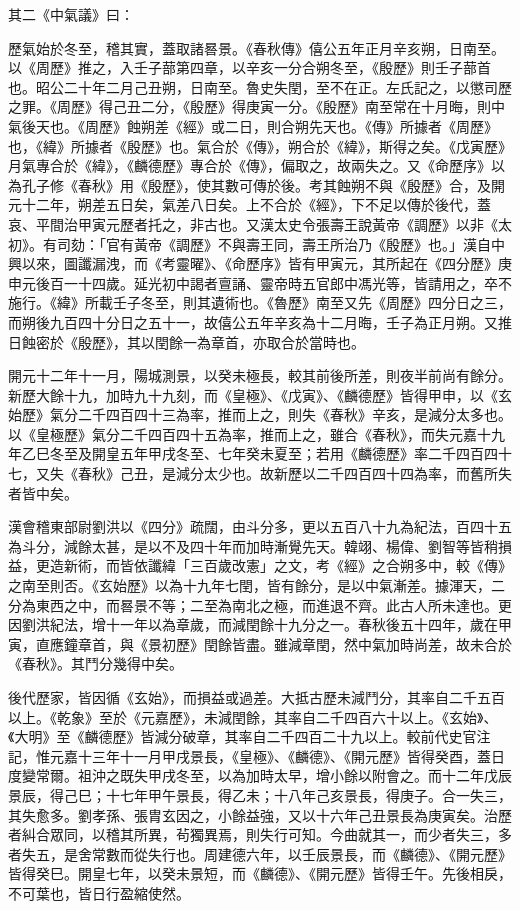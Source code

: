 \begin{pinyinscope}
 其二《中氣議》曰：



 歷氣始於冬至，稽其實，蓋取諸晷景。《春秋傳》僖公五年正月辛亥朔，日南至。以《周歷》推之，入壬子蔀第四章，以辛亥一分合朔冬至，《殷歷》則壬子蔀首也。昭公二十年二月己丑朔，日南至。魯史失閏，至不在正。左氏記之，以懲司歷之罪。《周歷》得己丑二分，《殷歷》得庚寅一分。《殷歷》南至常在十月晦，則中氣後天也。《周歷》蝕朔差《經》或二日，則合朔先天也。《傳》所據者《周歷》也，《緯》所據者《殷歷》也。氣合於《傳》，朔合於《緯》，斯得之矣。《戊寅歷》月氣專合於《緯》，《麟德歷》專合於《傳》，偏取之，故兩失之。又《命歷序》以為孔子修《春秋》用《殷歷》，使其數可傳於後。考其蝕朔不與《殷歷》合，及開元十二年，朔差五日矣，氣差八日矣。上不合於《經》，下不足以傳於後代，蓋哀、平間治甲寅元歷者托之，非古也。又漢太史令張壽王說黃帝《調歷》以非《太初》。有司劾：「官有黃帝《調歷》不與壽王同，壽王所治乃《殷歷》也。」漢自中興以來，圖讖漏洩，而《考靈曜》、《命歷序》皆有甲寅元，其所起在《四分歷》庚申元後百一十四歲。延光初中謁者亶誦、靈帝時五官郎中馮光等，皆請用之，卒不施行。《緯》所載壬子冬至，則其遺術也。《魯歷》南至又先《周歷》四分日之三，而朔後九百四十分日之五十一，故僖公五年辛亥為十二月晦，壬子為正月朔。又推日蝕密於《殷歷》，其以閏餘一為章首，亦取合於當時也。



 開元十二年十一月，陽城測景，以癸未極長，較其前後所差，則夜半前尚有餘分。新歷大餘十九，加時九十九刻，而《皇極》、《戊寅》、《麟德歷》皆得甲申，以《玄始歷》氣分二千四百四十三為率，推而上之，則失《春秋》辛亥，是減分太多也。以《皇極歷》氣分二千四百四十五為率，推而上之，雖合《春秋》，而失元嘉十九年乙巳冬至及開皇五年甲戌冬至、七年癸未夏至；若用《麟德歷》率二千四百四十七，又失《春秋》己丑，是減分太少也。故新歷以二千四百四十四為率，而舊所失者皆中矣。



 漢會稽東部尉劉洪以《四分》疏闊，由斗分多，更以五百八十九為紀法，百四十五為斗分，減餘太甚，是以不及四十年而加時漸覺先天。韓翊、楊偉、劉智等皆稍損益，更造新術，而皆依讖緯「三百歲改憲」之文，考《經》之合朔多中，較《傳》之南至則否。《玄始歷》以為十九年七閏，皆有餘分，是以中氣漸差。據渾天，二分為東西之中，而晷景不等；二至為南北之極，而進退不齊。此古人所未達也。更因劉洪紀法，增十一年以為章歲，而減閏餘十九分之一。春秋後五十四年，歲在甲寅，直應鐘章首，與《景初歷》閏餘皆盡。雖減章閏，然中氣加時尚差，故未合於《春秋》。其鬥分幾得中矣。



 後代歷家，皆因循《玄始》，而損益或過差。大抵古歷未減鬥分，其率自二千五百以上。《乾象》至於《元嘉歷》，未減閏餘，其率自二千四百六十以上。《玄始》、《大明》至《麟德歷》皆減分破章，其率自二千四百二十九以上。較前代史官注記，惟元嘉十三年十一月甲戌景長，《皇極》、《麟德》、《開元歷》皆得癸酉，蓋日度變常爾。祖沖之既失甲戌冬至，以為加時太早，增小餘以附會之。而十二年戊辰景辰，得己巳；十七年甲午景長，得乙未；十八年己亥景長，得庚子。合一失三，其失愈多。劉孝孫、張胄玄因之，小餘益強，又以十六年己丑景長為庚寅矣。治歷者糾合眾同，以稽其所異，茍獨異焉，則失行可知。今曲就其一，而少者失三，多者失五，是舍常數而從失行也。周建德六年，以壬辰景長，而《麟德》、《開元歷》皆得癸巳。開皇七年，以癸未景短，而《麟德》、《開元歷》皆得壬午。先後相戾，不可葉也，皆日行盈縮使然。




\end{pinyinscope}

